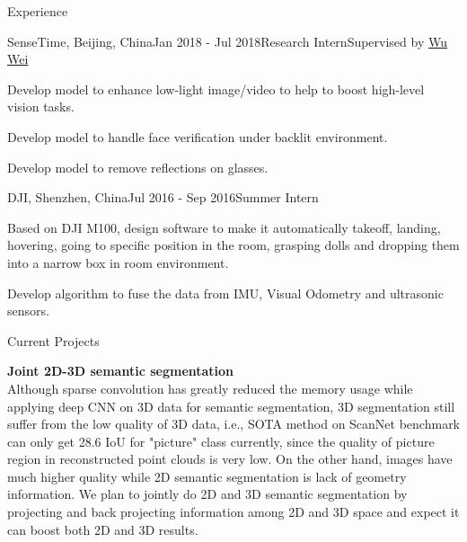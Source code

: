 \documentclass{resume} %
\begin{document}
\begin{rSection}{Experience}

\begin{rSubsection}{SenseTime, Beijing, China}{Jan 2018 - Jul 2018}{Research Intern}{Supervised by \href{https://wuwei-ai.org/}{Wu Wei}}
\item Develop model to enhance low-light image/video to help to boost high-level vision tasks.
\item Develop model to handle face verification under backlit environment.
\item Develop model to remove reflections on glasses.
\end{rSubsection}

\begin{rSubsection}{DJI, Shenzhen, China}{Jul 2016 - Sep 2016}{Summer Intern}{}
\item Based on DJI M100, design software to make it automatically takeoff, landing, hovering, going to specific position in the room, grasping dolls and dropping them into a narrow box in room environment.
\item Develop algorithm to fuse the data from IMU, Visual Odometry and ultrasonic sensors.
\end{rSubsection}

\end{rSection}
\begin{rSection}{Current Projects}

{\bf Joint 2D-3D semantic segmentation}
\\Although sparse convolution has greatly reduced the memory usage while applying deep CNN on 3D data for semantic segmentation, 3D segmentation still suffer from the low quality of 3D data, i.e., SOTA method on ScanNet benchmark can only get 28.6 IoU for "picture" class currently, since the quality of picture region in reconstructed point clouds is very low. On the other hand, images have much higher quality while 2D semantic segmentation is lack of geometry information. We plan to jointly do 2D and 3D semantic segmentation by projecting and back projecting information among 2D and 3D space and expect it can boost both 2D and 3D results.\\

\end{rSection}
\end{document}
